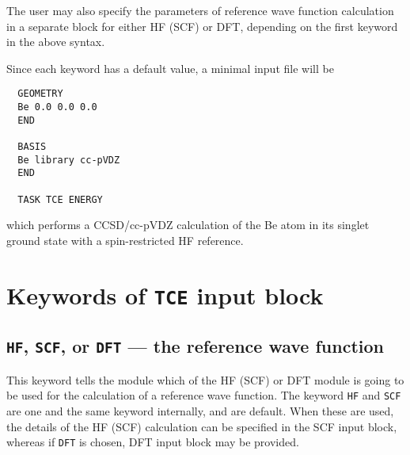 The user may also specify the parameters of reference wave function calculation
in a separate block for either HF (SCF) or DFT, depending on the first keyword
in the above syntax.

Since each keyword has a default value, a minimal input file will be
\begin{verbatim}
  GEOMETRY
  Be 0.0 0.0 0.0
  END

  BASIS
  Be library cc-pVDZ
  END

  TASK TCE ENERGY
\end{verbatim}
which performs a CCSD/cc-pVDZ calculation of the Be atom in its
singlet ground state with a spin-restricted HF reference.

\section{Keywords of {\tt TCE} input block}

\subsection{{\tt HF}, {\tt SCF}, or {\tt DFT} --- the reference wave function}

This keyword tells the module
which of the HF (SCF) or DFT module is going to be used for the calculation
of a reference wave function.  The keyword \verb+HF+ and \verb+SCF+ are
one and the same keyword internally, and are default.  When these are used,
the details of the HF (SCF) calculation can be specified in the SCF input
block, whereas if \verb+DFT+ is chosen, DFT input block may be provided.

